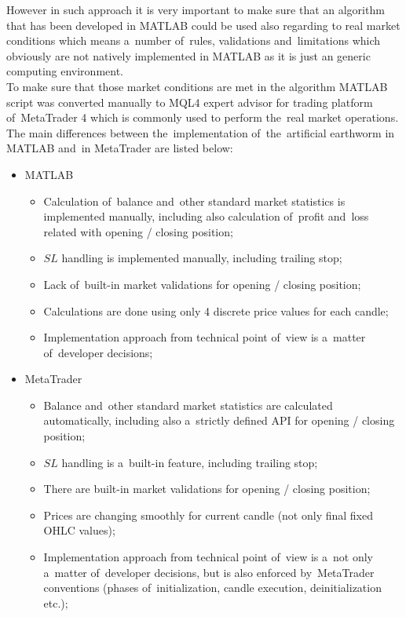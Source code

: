 \documentclass[runningheads,a4paper]{llncs}
\begin{document}
However in such approach it is very important to make sure that an algorithm that has been developed in MATLAB could be used also regarding to real market conditions which means a~number of~rules, validations and~limitations which obviously are not natively implemented in MATLAB as it is just an generic computing environment.\\

To make sure that those market conditions are met in the algorithm \mbox{MATLAB} script was converted manually to MQL4 expert advisor for trading platform of~MetaTrader 4 which is commonly used to perform the~real market operations.\\

The main differences between the~implementation of~the~artificial earthworm in MATLAB and~in MetaTrader are listed below:
\begin{itemize}
\item MATLAB
\begin{itemize}
\item Calculation of~balance and~other standard market statistics is implemented manually, including also calculation of~profit and~loss related with opening / closing position;
\item $SL$ handling is implemented manually, including trailing stop;
\item Lack of~built-in market validations for opening / closing position;
\item Calculations are done using only 4 discrete price values for each candle;
\item Implementation approach from technical point of~view is a~matter of~developer decisions;
\end{itemize}
\item MetaTrader
\begin{itemize}
\item Balance and~other standard market statistics are calculated automatically, including also a~strictly defined API for opening / closing position;
\item $SL$ handling is a~built-in feature, including trailing stop;
\item There are built-in market validations for opening / closing position;
\item Prices are changing smoothly for current candle (not only final fixed OHLC values);
\item Implementation approach from technical point of~view is a~not only a~matter of~developer decisions, but is also enforced by~MetaTrader conventions (phases of~initialization, candle execution, deinitialization etc.);
\end{itemize}
\end{itemize}
\end{document}
